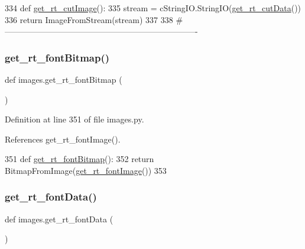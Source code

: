\begin{DoxyCode}
334 \textcolor{keyword}{def }\hyperlink{namespaceimages_afb08afa7f129f5a1687116c72ff11b35}{get\_rt\_cutImage}():
335     stream = cStringIO.StringIO(\hyperlink{namespaceimages_a88736560f7eb544aa69442ba704cffd6}{get\_rt\_cutData}())
336     \textcolor{keywordflow}{return} ImageFromStream(stream)
337 
338 \textcolor{comment}{#----------------------------------------------------------------------}
\end{DoxyCode}
\mbox{\label{namespaceimages_a8fabb5570ed966b2dd46d7e154c1ee16}} 
\subsubsection{\texorpdfstring{get\+\_\+rt\+\_\+font\+Bitmap()}{get\_rt\_fontBitmap()}}
{\footnotesize\ttfamily def images.\+get\+\_\+rt\+\_\+font\+Bitmap (\begin{DoxyParamCaption}{ }\end{DoxyParamCaption})}



Definition at line 351 of file images.\+py.



References get\+\_\+rt\+\_\+font\+Image().


\begin{DoxyCode}
351 \textcolor{keyword}{def }\hyperlink{namespaceimages_a8fabb5570ed966b2dd46d7e154c1ee16}{get\_rt\_fontBitmap}():
352     \textcolor{keywordflow}{return} BitmapFromImage(\hyperlink{namespaceimages_a934c1076ea7244d3996bb80131c3ad3c}{get\_rt\_fontImage}())
353 
\end{DoxyCode}
\mbox{\label{namespaceimages_a1b911d4fa04b4af968ec1adc8d82e9f1}} 
\subsubsection{\texorpdfstring{get\+\_\+rt\+\_\+font\+Data()}{get\_rt\_fontData()}}
{\footnotesize\ttfamily def images.\+get\+\_\+rt\+\_\+font\+Data (\begin{DoxyParamCaption}{ }\end{DoxyParamCaption})}



